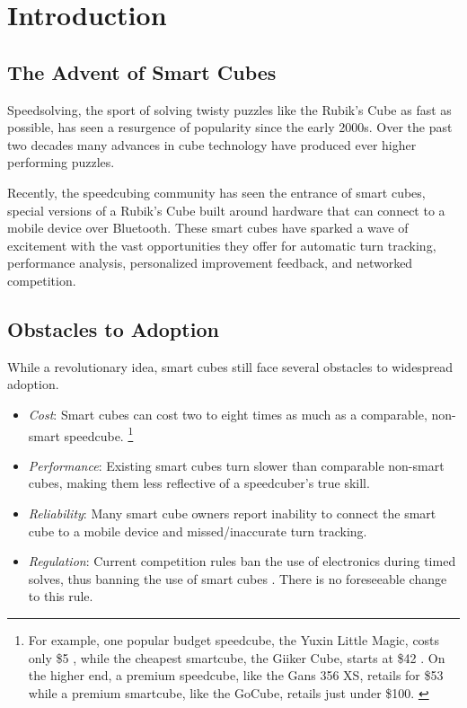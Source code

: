 \chapter{Introduction} 
\label{Chapter1}


\section{The Advent of Smart Cubes}

Speedsolving, the sport of solving twisty puzzles like the Rubik's Cube
as fast as possible, has seen a resurgence of popularity since the
early 2000s. \cite{wca-competition-history} Over the past two decades
many advances in cube technology have produced ever higher performing
puzzles.

Recently, the speedcubing community has seen the entrance of smart
cubes, special versions of a Rubik's Cube built around hardware that
can connect to a mobile device over Bluetooth. These smart cubes have
sparked a wave of excitement with the vast opportunities they offer for
automatic turn tracking, performance analysis, personalized improvement
feedback, and networked competition.


\section{Obstacles to Adoption}

While a revolutionary idea, smart cubes still face several obstacles to
widespread adoption.

\begin{itemize}

    \item \emph{Cost}: Smart cubes can cost two to eight times as much
    as a comparable, non-smart speedcube. \footnote{For example, one
    popular budget speedcube, the Yuxin Little Magic, costs only \$5
    \cite{yuxin-thecubicle}, while the cheapest smartcube, the Giiker
    Cube, starts at \$42 \cite{giiker-thecubicle}. On the higher end, a
    premium speedcube, like the Gans 356 XS, retails for \$53
    \cite{gans-xs-thecubicle} while a premium smartcube, like the
    GoCube, retails just under \$100. \cite{gocube-price}}
    
    \item \emph{Performance}: Existing smart cubes turn slower than
    comparable non-smart cubes, making them less reflective of a
    speedcuber's true skill. \cite{smartcube-regulation-discussion}
    
    \item \emph{Reliability}: Many smart cube owners report inability
    to connect the smart cube to a mobile device and missed/inaccurate
    turn tracking. \cite{smartcube-regulation-discussion}
    
    \item \emph{Regulation}: Current competition rules ban the use of
    electronics during timed solves, thus banning the use of smart
    cubes \cite{wca-regulations}. There is no foreseeable change to
    this rule. \cite{smartcube-regulation-discussion}
    
\end{itemize}

